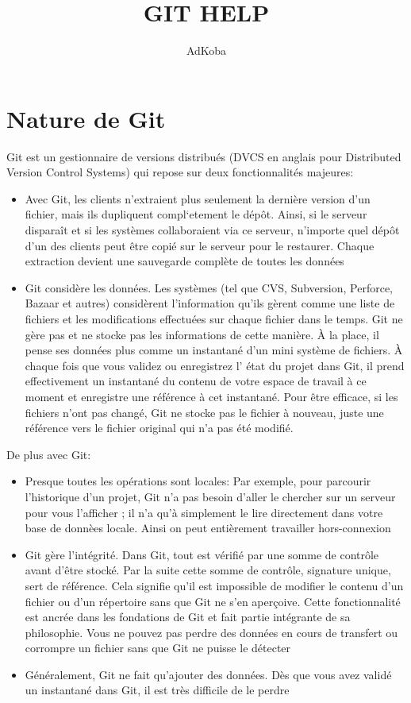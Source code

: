 \documentclass[10pt,a4paper]{report}
\title{GIT HELP}
\author{AdKoba}
\begin{document}
\section{Nature de Git} 

Git est un gestionnaire de versions distribu\'es (DVCS en anglais pour Distributed Version Control Systems) qui repose sur deux fonctionnalit\'es majeures:
\begin{itemize}
\item Avec Git, les clients n'extraient plus seulement la derni\`ere version d'un fichier, mais ils dupliquent compl`etement le d\'ep\^ot. Ainsi, si le serveur dispara\^it et si les syst\`emes collaboraient via ce serveur, n'importe quel d\'ep\^ot d'un des clients peut \^etre copi\'e sur le serveur pour le restaurer. Chaque extraction devient une sauvegarde compl\`ete de toutes les donn\'ees
\item Git consid\`ere les donn\'ees. Les syst\`emes (tel que CVS, Subversion, Perforce, Bazaar et autres) consid\`erent l'information qu'ils g\`erent comme une liste de fichiers et les modifications effectu\'ees sur chaque fichier dans le temps. Git ne g\`ere pas et ne stocke pas les informations de cette mani\`ere. \`A la place, il pense ses donn\'ees plus comme un instantan\'e d'un mini syst\`eme de fichiers. \`A chaque fois que vous validez ou enregistrez l' \'etat du projet dans Git, il prend effectivement un instantan\'e du contenu de votre espace de travail \`a ce moment et enregistre une r\'ef\'erence \`a cet instantan\'e. Pour \^etre efficace, si les fichiers n'ont pas chang\'e, Git ne stocke pas le fichier \`a nouveau, juste une r\'ef\'erence vers le fichier original qui n'a pas \'et\'e modifi\'e.\newline 
\end{itemize} 

De plus avec Git:
\begin{itemize}
\item Presque toutes les op\'erations sont locales: 
Par exemple, pour parcourir l'historique d'un projet, Git n'a pas besoin d'aller le chercher sur un serveur pour vous l'afficher ; il n'a qu'\`a simplement le lire directement dans votre base de donn\`ees locale. 
Ainsi on peut enti\`erement travailler hors-connexion 
\item Git g\`ere l'int\'egrit\'e. 
Dans Git, tout est v\'erifi\'e par une somme de contr\^ole avant d'\^etre stock\'e. Par la suite cette somme de contr\^ole, signature unique, sert de r\'ef\'erence. Cela signifie qu'il est impossible de modifier le contenu d'un fichier ou d'un r\'epertoire sans que Git ne s'en aper\c{c}oive. Cette fonctionnalit\'e est ancr\'ee dans les fondations de Git et fait partie int\'egrante de sa philosophie. Vous ne pouvez pas perdre des donn\'ees en cours de transfert ou corrompre un fichier sans que Git ne puisse le d\'etecter
\item G\'en\'eralement, Git ne fait qu'ajouter des donn\'ees.
D\`es que vous avez valid\'e un instantan\'e dans Git, il est tr\`es difficile de le perdre
\end{itemize}
\end{document}
